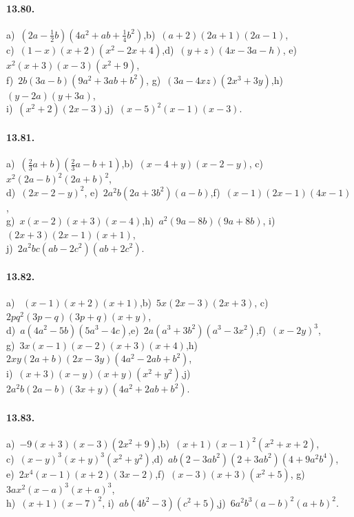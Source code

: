 \paragraph{13.80.} a)~$\left(2a-\frac{1}{2}b\right)\left(4a^{2}+{ab}+\frac{1}{4}b^{2}\right)$,\quad b)~$(a+2)\left(2a+1\right)\left(2a-1\right)$,\quad \protect\\
c)~$(1-x)\left(x+2\right)\left(x^{2}-2x+4\right)$,\quad d)~$(y+z)(4x-3a-h)$,\quad
e)~$x^{2}(x+3)(x-3)\left(x^{2}+9\right)$,\protect\\
f)~$2b(3a-b)\left(9a^{2}+3{ab}+b^{2}\right)$,\quad
g)~$(3a-4{xz})\left(2x^{3}+3y\right)$,\quad h)~$(y-2a)\left(y+3a\right)$,\quad \protect\\
i)~$\left(x^{2}+2\right)(2x-3)$,\quad j)~$(x-5)^{2}(x-1)(x-3)$.

\paragraph{13.81.} a)~$\left(\frac{2}{3}a+b\right)\left(\frac{2}{3}a-b+1\right)$,\quad b)~$(x-4+y)(x-2-y)$,\quad
c)~$x^{2}(2a-b)^{2}(2a+b)^{2}$,\protect\\
d)~$(2x-2-y)^{2}$,\quad
e)~$2a^{2}b(2a+3b^{2})(a-b)$,\quad f)~$(x-1)(2x-1)(4x-1)$,\quad \protect\\
g)~$x(x-2)(x+3)(x-4)$,\quad h)~$a^{2}(9a-8b)(9a+8b)$,\quad
i)~$(2x+3)(2x-1)(x+1)$,\protect\\
j)~$2a^{2}{bc}({ab}-2c^{2})({ab}+2c^{2})$.

\paragraph{13.82.} a)~ $(x-1)(x+2)(x+1)$,\quad b)~$5x(2x-3)(2x+3)$,\quad
c)~$2{pq}^{2}(3p-q)(3p+q)(x+y)$,\protect\\
d)~$a(4a^{2}-5b)(5a^{3}-4c)$,\quad e)~$2a(a^{3}+3b^{2})(a^{3}-3x^{2})$,\quad f)~$(x-2y)^{3}$,\quad \protect\\
g)~$3x(x-1)(x-2)(x+3)(x+4)$,\quad h)~$2xy(2a+b)(2x-3y)(4a^{2}-2{ab}+b^{2})$,\quad \protect\\
i)~$(x+3)(x-y)(x+y)(x^{2}+y^{2})$,\quad j)~$2a^{2}b(2a-b)(3x+y)(4a^{2}+2{ab}+b^{2})$.

\paragraph{13.83.} a)~$-9(x+3)(x-3)(2x^{2}+9)$,\quad b)~$(x+1)(x-1)^{2}(x^{2}+x+2)$,\quad \protect\\
c)~$(x-y)^{3}(x+y)^{3}(x^{2}+y^{2})$,\quad d)~${ab}(2-3{ab}^{2})(2+3{ab}^{2})(4+9a^{2}b^{4})$,\quad \protect\\
e)~$2x^{4}(x-1)(x+2)(3x-2)$,\quad f)~$(x-3)(x+3)(x^{2}+5)$,\quad
g)~$3ax^{2}(x-a)^{3}(x+a)^{3}$,\protect\\
h)~$(x+1)(x-7)^{2}$,\quad
i)~${ab}(4b^{2}-3)(c^{2}+5)$,\quad j)~$6a^{2}b^{3}(a-b)^{2}(a+b)^{2}$.

